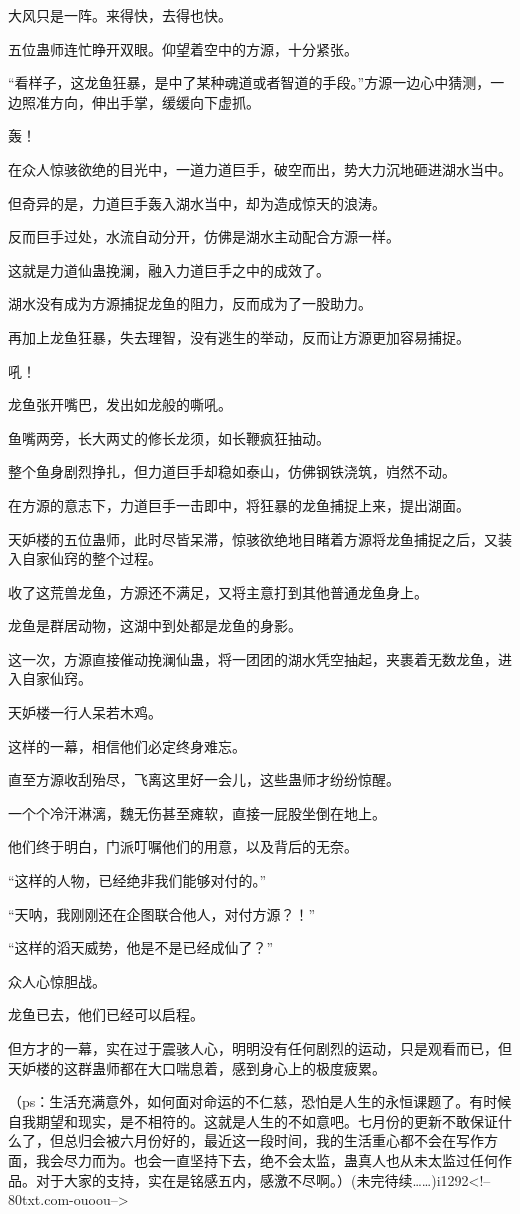 \begin{this_body}
大风只是一阵。来得快，去得也快。

五位蛊师连忙睁开双眼。仰望着空中的方源，十分紧张。

“看样子，这龙鱼狂暴，是中了某种魂道或者智道的手段。”方源一边心中猜测，一边照准方向，伸出手掌，缓缓向下虚抓。

轰！

在众人惊骇欲绝的目光中，一道力道巨手，破空而出，势大力沉地砸进湖水当中。

但奇异的是，力道巨手轰入湖水当中，却为造成惊天的浪涛。

反而巨手过处，水流自动分开，仿佛是湖水主动配合方源一样。

这就是力道仙蛊挽澜，融入力道巨手之中的成效了。

湖水没有成为方源捕捉龙鱼的阻力，反而成为了一股助力。

再加上龙鱼狂暴，失去理智，没有逃生的举动，反而让方源更加容易捕捉。

吼！

龙鱼张开嘴巴，发出如龙般的嘶吼。

鱼嘴两旁，长大两丈的修长龙须，如长鞭疯狂抽动。

整个鱼身剧烈挣扎，但力道巨手却稳如泰山，仿佛钢铁浇筑，岿然不动。

在方源的意志下，力道巨手一击即中，将狂暴的龙鱼捕捉上来，提出湖面。

天妒楼的五位蛊师，此时尽皆呆滞，惊骇欲绝地目睹着方源将龙鱼捕捉之后，又装入自家仙窍的整个过程。

收了这荒兽龙鱼，方源还不满足，又将主意打到其他普通龙鱼身上。

龙鱼是群居动物，这湖中到处都是龙鱼的身影。

这一次，方源直接催动挽澜仙蛊，将一团团的湖水凭空抽起，夹裹着无数龙鱼，进入自家仙窍。

天妒楼一行人呆若木鸡。

这样的一幕，相信他们必定终身难忘。

直至方源收刮殆尽，飞离这里好一会儿，这些蛊师才纷纷惊醒。

一个个冷汗淋漓，魏无伤甚至瘫软，直接一屁股坐倒在地上。

他们终于明白，门派叮嘱他们的用意，以及背后的无奈。

“这样的人物，已经绝非我们能够对付的。”

“天呐，我刚刚还在企图联合他人，对付方源？！”

“这样的滔天威势，他是不是已经成仙了？”

众人心惊胆战。

龙鱼已去，他们已经可以启程。

但方才的一幕，实在过于震骇人心，明明没有任何剧烈的运动，只是观看而已，但天妒楼的这群蛊师都在大口喘息着，感到身心上的极度疲累。

（ps：生活充满意外，如何面对命运的不仁慈，恐怕是人生的永恒课题了。有时候自我期望和现实，是不相符的。这就是人生的不如意吧。七月份的更新不敢保证什么了，但总归会被六月份好的，最近这一段时间，我的生活重心都不会在写作方面，我会尽力而为。也会一直坚持下去，绝不会太监，蛊真人也从未太监过任何作品。对于大家的支持，实在是铭感五内，感激不尽啊。）(未完待续……)i1292<!--80txt.com-ouoou-->

\end{this_body}

